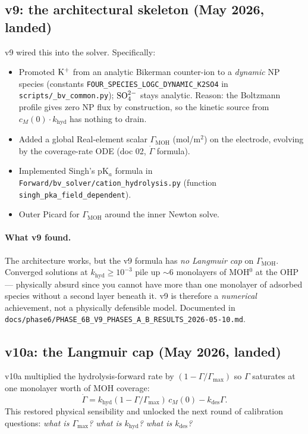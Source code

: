 \documentclass[11pt]{article}
\begin{document}
\subsection{v9: the architectural skeleton (May 2026, landed)}

v9 wired this into the solver. Specifically:
\begin{itemize}[leftmargin=*]
  \item Promoted $\mathrm{K^+}$ from an analytic Bikerman counter-ion to a
        \emph{dynamic} NP species (constants
        \texttt{FOUR\_SPECIES\_LOGC\_DYNAMIC\_K2SO4} in
        \texttt{scripts/\_bv\_common.py}); $\mathrm{SO_4^{2-}}$ stays analytic.
        Reason: the Boltzmann profile gives zero NP flux by
        construction, so the kinetic source from
        $c_M(0) \cdot k_{\mathrm{hyd}}$ has nothing to drain.
  \item Added a global Real-element scalar $\Gamma_{\mathrm{MOH}}$ (mol/m$^2$)
        on the electrode, evolving by the coverage-rate ODE
        (doc 02, $\dot\Gamma$ formula).
  \item Implemented Singh's pK$_a$ formula in
        \texttt{Forward/bv\_solver/cation\_hydrolysis.py} (function
        \texttt{singh\_pka\_field\_dependent}).
  \item Outer Picard for $\Gamma_{\mathrm{MOH}}$ around the inner
        Newton solve.
\end{itemize}

\paragraph{What v9 found.} The architecture works, but the v9
formula has \emph{no Langmuir cap} on $\Gamma_{\mathrm{MOH}}$.
Converged solutions at $k_{\mathrm{hyd}} \ge 10^{-3}$ pile up
$\sim 6$ monolayers of MOH$^{0}$ at the OHP --- physically absurd
since you cannot have more than one monolayer of adsorbed species
without a second layer beneath it. v9 is therefore a
\emph{numerical} achievement, not a physically defensible model.
Documented in
\texttt{docs/phase6/PHASE\_6B\_V9\_PHASES\_A\_B\_RESULTS\_2026-05-10.md}.

\subsection{v10a: the Langmuir cap (May 2026, landed)}

v10a multiplied the hydrolysis-forward rate by
$(1 - \Gamma/\Gamma_{\max})$ so $\Gamma$ saturates at one monolayer
worth of MOH coverage:
\[
  \dot\Gamma = k_{\mathrm{hyd}} (1 - \Gamma/\Gamma_{\max})\,c_M(0)
             - k_{\mathrm{des}} \Gamma.
\]
This restored physical sensibility and unlocked the next round of
calibration questions: \emph{what is $\Gamma_{\max}$? what is
$k_{\mathrm{hyd}}$? what is $k_{\mathrm{des}}$?}
\end{document}
